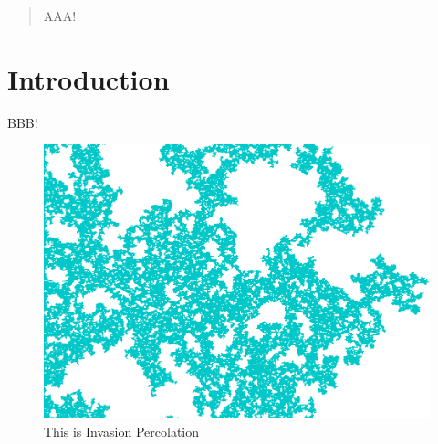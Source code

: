 \begin{abstract}
AAA!
\end{abstract}

\section{Introduction}

BBB!  \cite{Asai2016}

\begin{figure}[tb]
 \includegraphics[width=\linewidth]{img/static/ip.png}
 \caption{This is Invasion Percolation}
 \label{fig:ip}
\end{figure}

